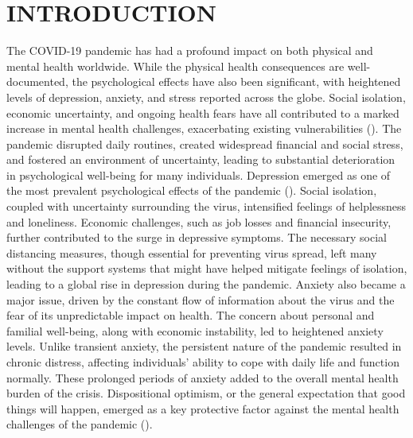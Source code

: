\documentclass[a4paper]{article}
\begin{document}
\section{INTRODUCTION}
\vspace{0.5em}
The COVID-19 pandemic has had a profound impact on both physical and mental health worldwide.\newline
While the physical health consequences are well-documented, the psychological effects have also been significant, with heightened levels of depression, anxiety, and stress reported across the globe.
Social isolation, economic uncertainty, and ongoing health fears have all contributed to a marked increase in mental health challenges, exacerbating existing vulnerabilities (\citet{PsychologicalImpactQuarantine}).
The pandemic disrupted daily routines, created widespread financial and social stress, and fostered an environment of uncertainty, leading to substantial deterioration in psychological well-being for many individuals.
\vspace{0.5em}\newline
Depression emerged as one of the most prevalent psychological effects of the pandemic (\citet{PrevalenceDepressionDuringCOVID-19}).
Social isolation, coupled with uncertainty surrounding the virus, intensified feelings of helplessness and loneliness.
Economic challenges, such as job losses and financial insecurity, further contributed to the surge in depressive symptoms.
The necessary social distancing measures, though essential for preventing virus spread,
left many without the support systems that might have helped mitigate feelings of isolation, leading to a global rise in depression during the pandemic.
\vspace{0.5em}\newline
Anxiety also became a major issue, driven by the constant flow of information about the virus and the fear of its unpredictable impact on health.
The concern about personal and familial well-being, along with economic instability, led to heightened anxiety levels.
Unlike transient anxiety, the persistent nature of the pandemic resulted in chronic distress, affecting individuals' ability to cope with daily life and function normally.
These prolonged periods of anxiety added to the overall mental health burden of the crisis.
\vspace{0.5em}\newline
Dispositional optimism, or the general expectation that good things will happen, emerged as a key protective factor against the mental health challenges of the pandemic (\citet{Carver2010WileyInterdisciplinaryReviews}).
\end{document}
